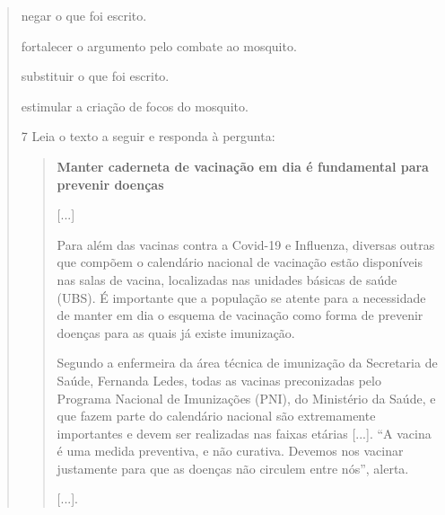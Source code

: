 \begin{quote}
\begin{escolha}
\item negar o que foi escrito.

\item fortalecer o argumento pelo combate ao mosquito.

\item substituir o que foi escrito.

\item estimular a criação de focos do mosquito.
\end{escolha}


\num{7} Leia o texto a seguir e responda à pergunta:

\begin{quote}
\textbf{Manter caderneta de vacinação em dia é fundamental para prevenir
doenças}

{[}...{]}

Para além das vacinas contra a Covid-19 e Influenza, diversas outras que
compõem o calendário nacional de vacinação estão disponíveis nas salas
de vacina, localizadas nas unidades básicas de saúde (UBS). É importante
que a população se atente para a necessidade de manter em dia o esquema
de vacinação como forma de prevenir doenças para as quais já existe
imunização.

Segundo a enfermeira da área técnica de imunização da Secretaria de
Saúde, Fernanda Ledes, todas as vacinas preconizadas pelo Programa
Nacional de Imunizações (PNI), do Ministério da Saúde, e que fazem parte
do calendário nacional são extremamente importantes e devem ser
realizadas nas faixas etárias {[}...{]}. ``A vacina é uma medida
preventiva, e não curativa. Devemos nos vacinar justamente para que as
doenças não circulem entre nós'', alerta.

{[}...{]}.


\end{quote}
\end{quote}
